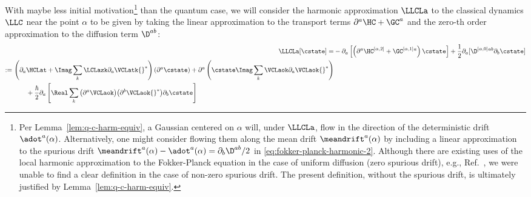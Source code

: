 \documentclass{article}
\numberwithin{equation}{section}
\begin{document}
With maybe less initial motivation\footnote{Per Lemma~\ref{lem:q-c-harm-equiv}, a Gaussian centered on $\alpha$ will, under $\LLCLa$, flow in the direction of the deterministic drift $\adot^a(\alpha)$. Alternatively, one might consider flowing them along the mean drift $\meandrift^a(\alpha)$ by including a linear approximation to the spurious drift $\meandrift^a(\alpha)-\adot^a(\alpha) = \partial_b\D^{ab}/2$ in \eqref{eq:fokker-planck-harmonic-2}. Although there are existing uses of the local harmonic approximation to the Fokker-Planck equation in the case of uniform diffusion (zero spurious drift), e.g., Ref.~\cite{ben-nun1992approximate}, we were unable to find a clear definition in the case of non-zero spurious drift. The present definition, without the spurious drift, is ultimately justified by Lemma~\ref{lem:q-c-harm-equiv}.} than the quantum case, we will consider the harmonic approximation 
$\LLCLa$ to the classical dynamics $\LLC$ near the point $\alpha$ to be given by taking the linear approximation to the transport terms $\partial^a\HC + \GC^a$ and the zero-th order approximation to the diffusion term $\D^{ab}$: 
\begin{align}\label{eq:classical-fokker-planck-harmonic}
	\LLCLa [\cstate]
        =& - \partial_a \left[\left(\partial^a\HC^{[\alpha,2]} +  \GC^{[\alpha,1]}{}^a \right) \cstate \right]  + \frac{1}{2} \partial_a[\D^{[\alpha,0]}{}^{ab} \partial_b \cstate]
        \\
    \begin{split}
        \label{eq:classical-fokker-planck-harmonic-detailed}
	:=\,& \left(\partial_a \HCLat+ \Imag \sum_k \LCLazk \partial_a  \VCLatk{}^*\right)(\partial^a \cstate)  + \partial^a\left(\cstate  \Imag \sum_k \VCLaok \partial_a  \VCLaok{}^* \right)   \\ 
	&\qquad + \frac{\hbar}{2}  \partial_a\left[ \Real \sum_k\big(\partial^a \VCLaok\big)\big(\partial^b  \VCLaok{}^*\big) \partial_b \cstate\right]
    \end{split}
\end{align}
\end{document}
